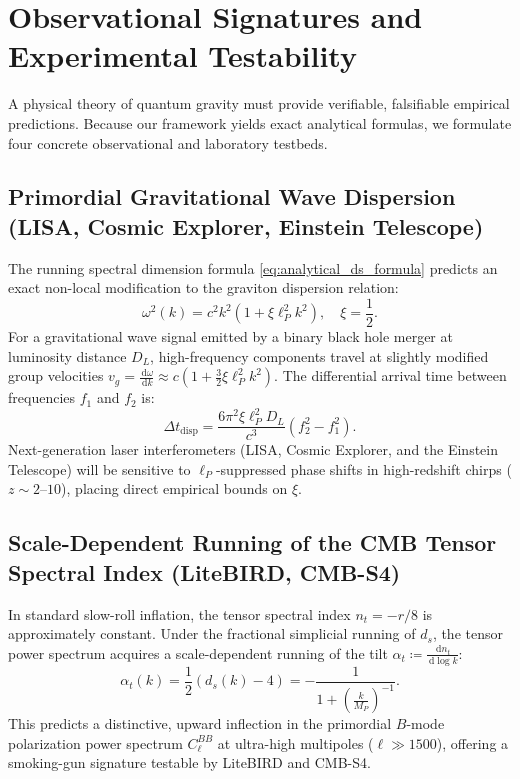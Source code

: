 \documentclass[11pt,a4paper,reqno]{amsart}
\theoremstyle{definition}
\numberwithin{equation}{section}
\newcommand{\dif}{\,\mathrm{d}}
\begin{document}
\section{Observational Signatures and Experimental Testability}
\label{sec:experimental}

A physical theory of quantum gravity must provide verifiable, falsifiable empirical predictions. Because our framework yields exact analytical formulas, we formulate four concrete observational and laboratory testbeds.

\subsection{Primordial Gravitational Wave Dispersion (LISA, Cosmic Explorer, Einstein Telescope)}
The running spectral dimension formula \eqref{eq:analytical_ds_formula} predicts an exact non-local modification to the graviton dispersion relation:
\begin{equation}
    \label{eq:graviton_dispersion}
    \omega^2(k) = c^2 k^2 \left( 1 + \xi \ell_P^2 k^2 \right), \quad \xi = \frac{1}{2}.
\end{equation}
For a gravitational wave signal emitted by a binary black hole merger at luminosity distance $D_L$, high-frequency components travel at slightly modified group velocities $v_g = \frac{\dif \omega}{\dif k} \approx c(1 + \frac{3}{2}\xi \ell_P^2 k^2)$. The differential arrival time between frequencies $f_1$ and $f_2$ is:
\begin{equation}
    \Delta t_{\mathrm{disp}} = \frac{6 \pi^2 \xi \ell_P^2 D_L}{c^3} \left( f_2^2 - f_1^2 \right).
\end{equation}
Next-generation laser interferometers (LISA, Cosmic Explorer, and the Einstein Telescope) will be sensitive to $\ell_P$-suppressed phase shifts in high-redshift chirps ($z \sim 2$--$10$), placing direct empirical bounds on $\xi$.

\subsection{Scale-Dependent Running of the CMB Tensor Spectral Index (LiteBIRD, CMB-S4)}
In standard slow-roll inflation, the tensor spectral index $n_t = -r/8$ is approximately constant. Under the fractional simplicial running of $d_s$, the tensor power spectrum acquires a scale-dependent running of the tilt $\alpha_t \coloneqq \frac{\dif n_t}{\dif \log k}$:
\begin{equation}
    \alpha_t(k) = \frac{1}{2} \left( d_s(k) - 4 \right) = -\frac{1}{1 + \left(\frac{k}{M_P}\right)^{-1}}.
\end{equation}
This predicts a distinctive, upward inflection in the primordial $B$-mode polarization power spectrum $C_\ell^{BB}$ at ultra-high multipoles ($\ell \gg 1500$), offering a smoking-gun signature testable by LiteBIRD and CMB-S4.
\end{document}
